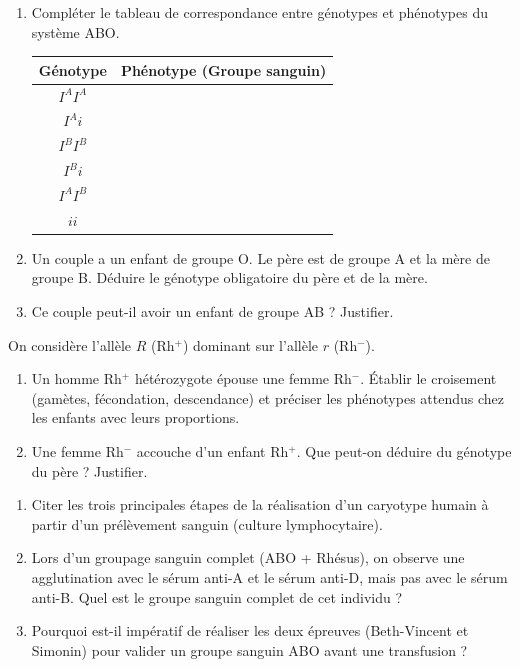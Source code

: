 \documentclass[11pt]{article}
\begin{document}
\begin{exercice}
\begin{enumerate}
    \item Compléter le tableau de correspondance entre génotypes et phénotypes du système ABO.
    \begin{tabular}{|c|c|}
    \hline
    Génotype & Phénotype (Groupe sanguin) \\ \hline
    $I^A I^A$ &  \\ \hline
    $I^A i$ &  \\ \hline
    $I^B I^B$ &  \\ \hline
    $I^B i$ &  \\ \hline
    $I^A I^B$ &  \\ \hline
    $ii$ &  \\ \hline
    \end{tabular}
    \item Un couple a un enfant de groupe O. Le père est de groupe A et la mère de groupe B. Déduire le génotype obligatoire du père et de la mère.
    \item Ce couple peut-il avoir un enfant de groupe AB ? Justifier.
\end{enumerate}
\end{exercice}

\begin{exercice}
On considère l'allèle $R$ (Rh$^+$) dominant sur l'allèle $r$ (Rh$^-$).
\begin{enumerate}
    \item Un homme Rh$^+$ hétérozygote épouse une femme Rh$^-$. Établir le croisement (gamètes, fécondation, descendance) et préciser les phénotypes attendus chez les enfants avec leurs proportions.
    \item Une femme Rh$^-$ accouche d'un enfant Rh$^+$. Que peut-on déduire du génotype du père ? Justifier.
\end{enumerate}
\end{exercice}

\begin{exercice}
\begin{enumerate}
    \item Citer les trois principales étapes de la réalisation d'un caryotype humain à partir d'un prélèvement sanguin (culture lymphocytaire).
    \item Lors d'un groupage sanguin complet (ABO + Rhésus), on observe une agglutination avec le sérum anti-A et le sérum anti-D, mais pas avec le sérum anti-B. Quel est le groupe sanguin complet de cet individu ?
    \item Pourquoi est-il impératif de réaliser les deux épreuves (Beth-Vincent et Simonin) pour valider un groupe sanguin ABO avant une transfusion ?
\end{enumerate}
\end{exercice}
\end{document}
